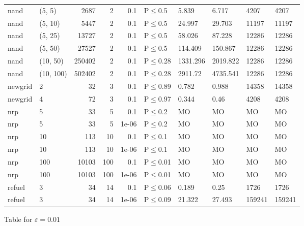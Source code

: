 \begin{longtable}{llrrrlllll}
 nand          & (5, 5)    &   	2687 &   2 & 0.1   & P$\leq$0.5   & 5.839    & 6.717    & 4207   & 4207   \\
 nand          & (5, 10)   &   	5447 &   2 & 0.1   & P$\leq$0.5   & 24.997   & 29.703   & 11197  & 11197  \\
 nand          & (5, 25)   &  	13727 &   2 & 0.1   & P$\leq$0.5   & 58.026   & 87.228   & 12286  & 12286  \\
 nand          & (5, 50)   &  	27527 &   2 & 0.1   & P$\leq$0.5   & 114.409  & 150.867  & 12286  & 12286  \\
 nand          & (10, 50)  & 	250402 &   2 & 0.1   & P$\leq$0.28  & 1331.296 & 2019.822 & 12286  & 12286  \\
 nand          & (10, 100) & 	502402 &   2 & 0.1   & P$\leq$0.28  & 2911.72  & 4735.541 & 12286  & 12286  \\
 newgrid       & 2         &     	32 &   3 & 0.1   & P$\leq$0.89  & 0.782    & 0.988    & 14358  & 14358  \\
 newgrid       & 4         &     	72 &   3 & 0.1   & P$\leq$0.97  & 0.344    & 0.46     & 4208   & 4208   \\
 nrp           & 5         &     	33 &   5 & 0.1   & P$\leq$0.2   & MO       & MO       & MO     & MO     \\
 nrp           & 5         &     	33 &   5 & 1e-06 & P$\leq$0.2   & MO       & MO       & MO     & MO     \\
 nrp           & 10        &    	113 &  10 & 0.1   & P$\leq$0.1   & MO       & MO       & MO     & MO     \\
 nrp           & 10        &    	113 &  10 & 1e-06 & P$\leq$0.1   & MO       & MO       & MO     & MO     \\
 nrp           & 100       &  	10103 & 100 & 0.1   & P$\leq$0.01  & MO       & MO       & MO     & MO     \\
 nrp           & 100       &  	10103 & 100 & 1e-06 & P$\leq$0.01  & MO       & MO       & MO     & MO     \\
 refuel        & 3         &     	34 &  14 & 0.1   & P$\leq$0.06  & 0.189    & 0.25     & 1726   & 1726   \\
 refuel        & 3         &     	34 &  14 & 1e-06 & P$\leq$0.09  & 21.322   & 27.493   & 159241 & 159241 \\
\bottomrule
\end{longtable}
\small Table for \(\varepsilon=0.01\)
